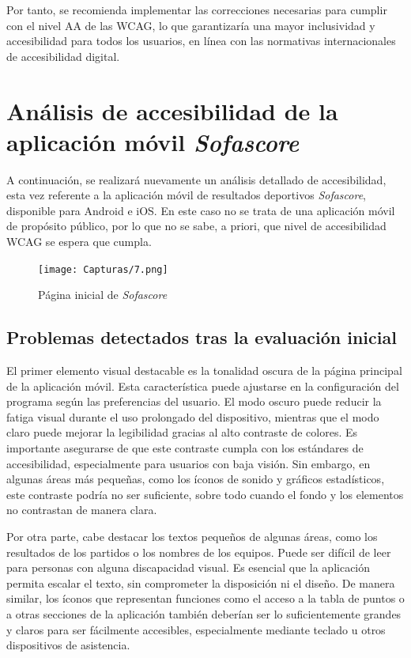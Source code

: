 \documentclass[]{article}
\begin{document}
Por tanto, se recomienda implementar las correcciones necesarias para cumplir con el nivel AA de las WCAG, lo que garantizaría una mayor inclusividad y accesibilidad para todos los usuarios, en línea con las normativas internacionales de accesibilidad digital.
\newpage

\section{Análisis de accesibilidad de la aplicación móvil \textit{Sofascore}}

A continuación, se realizará nuevamente un análisis detallado de accesibilidad, esta vez referente a la aplicación móvil de resultados deportivos \textit{Sofascore}, disponible para Android e iOS. En este caso no se trata de una aplicación móvil de propósito público, por lo que no se sabe, a priori, que nivel de accesibilidad WCAG se espera que cumpla.

\begin{figure}[H]
	\centering
	\texttt{[image: Capturas/7.png]}
	\caption{Página inicial de \textit{Sofascore}}
	\label{fig:etiqueta}
\end{figure}

\subsection{Problemas detectados tras la evaluación inicial}

El primer elemento visual destacable es la tonalidad oscura de la página principal de la aplicación móvil. Esta característica puede ajustarse en la configuración del programa según las preferencias del usuario. El modo oscuro puede reducir la fatiga visual durante el uso prolongado del dispositivo, mientras que el modo claro puede mejorar la legibilidad gracias al alto contraste de colores. Es importante asegurarse de que este contraste cumpla con los estándares de accesibilidad, especialmente para usuarios con baja visión. Sin embargo, en algunas áreas más pequeñas, como los íconos de sonido y gráficos estadísticos, este contraste podría no ser suficiente, sobre todo cuando el fondo y los elementos no contrastan de manera clara.

Por otra parte, cabe destacar los textos pequeños de algunas áreas, como los resultados de los partidos o los nombres de los equipos. Puede ser difícil de leer para personas con alguna discapacidad visual. Es esencial que la aplicación permita escalar el texto, sin comprometer la disposición ni el diseño. De manera similar, los íconos que representan funciones como el acceso a la tabla de puntos o a otras secciones de la aplicación también deberían ser lo suficientemente grandes y claros para ser fácilmente accesibles, especialmente mediante teclado u otros dispositivos de asistencia.
\end{document}
